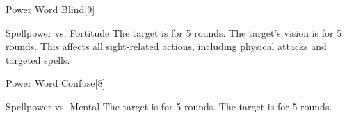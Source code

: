 \begin{spellsection}{Power Word Blind}[9]
    \begin{spellheader}
    \end{spellheader}
    \begin{spellcontent}
        \begin{spelltargetinginfo}
        \end{spelltargetinginfo}
        \begin{spelleffects}
            \begin{spellattack}{Spellpower vs. Fortitude}
                \spellsuccess The target is \blinded for 5 rounds.
                \spellfailure The target's vision is \impaired for 5 rounds. This affects all sight-related actions, including physical attacks and targeted spells.
            \end{spellattack}
        \end{spelleffects}
    \end{spellcontent}
    \begin{spellfooter}
        \miscastrandom
    \end{spellfooter}
\end{spellsection}

\begin{spellsection}{Power Word Confuse}[8]
    \begin{spellheader}
    \end{spellheader}
    \begin{spellcontent}
        \begin{spelltargetinginfo}
        \end{spelltargetinginfo}
        \begin{spelleffects}
            \begin{spellattack}{Spellpower vs. Mental}
                \spellsuccess The target is \confused for 5 rounds.
                \spellfailure The target is \disoriented for 5 rounds.
            \end{spellattack}
        \end{spelleffects}
    \end{spellcontent}
    \begin{spellfooter}
        \miscastrandom
    \end{spellfooter}
\end{spellsection}

